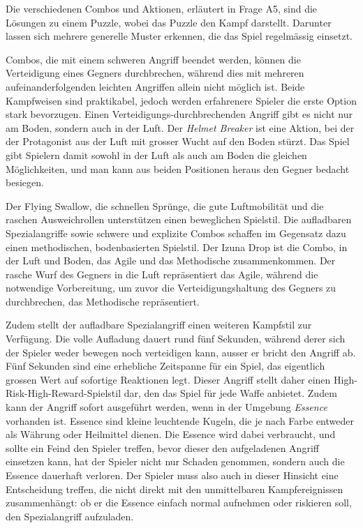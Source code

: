 \documentclass[../Main.tex]{subfiles}
\begin{document}
Die verschiedenen Combos und Aktionen, erläutert in Frage A5, sind die Lösungen zu einem Puzzle, wobei das Puzzle den Kampf darstellt. Darunter lassen sich mehrere generelle Muster erkennen, die das Spiel regelmässig einsetzt.

Combos, die mit einem schweren Angriff beendet werden, können die Verteidigung eines Gegners durchbrechen, während dies mit mehreren aufeinanderfolgenden leichten Angriffen allein nicht möglich ist. Beide Kampfweisen sind praktikabel, jedoch werden erfahrenere Spieler die erste Option stark bevorzugen. Einen Verteidigungs-durchbrechenden Angriff gibt es nicht nur am Boden, sondern auch in der Luft. Der \textit{Helmet Breaker} ist eine Aktion, bei der der Protagonist aus der Luft mit grosser Wucht auf den Boden stürzt. Das Spiel gibt Spielern damit sowohl in der Luft als auch am Boden die gleichen Möglichkeiten, und man kann aus beiden Positionen heraus den Gegner bedacht besiegen.

Der Flying Swallow, die schnellen Sprünge, die gute Luftmobilität und die raschen Ausweichrollen unterstützen einen beweglichen Spielstil. Die aufladbaren Spezialangriffe sowie schwere und explizite Combos schaffen im Gegensatz dazu einen methodischen, bodenbasierten Spielstil. Der Izuna Drop ist die Combo, in der Luft und Boden, das Agile und das Methodische zusammenkommen. Der rasche Wurf des Gegners in die Luft repräsentiert das Agile, während die notwendige Vorbereitung, um zuvor die Verteidigungshaltung des Gegners zu durchbrechen, das Methodische repräsentiert.

Zudem stellt der aufladbare Spezialangriff einen weiteren Kampfstil zur Verfügung. Die volle Aufladung dauert rund fünf Sekunden, während derer sich der Spieler weder bewegen noch verteidigen kann, ausser er bricht den Angriff ab. Fünf Sekunden sind eine erhebliche Zeitspanne für ein Spiel, das eigentlich grossen Wert auf sofortige Reaktionen legt. Dieser Angriff stellt daher einen High-Risk-High-Reward-Spielstil dar, den das Spiel für jede Waffe anbietet. Zudem kann der Angriff sofort ausgeführt werden, wenn in der Umgebung \textit{Essence} vorhanden ist. Essence sind kleine leuchtende Kugeln, die je nach Farbe entweder als Währung oder Heilmittel dienen. Die Essence wird dabei verbraucht, und sollte ein Feind den Spieler treffen, bevor dieser den aufgeladenen Angriff einsetzen kann, hat der Spieler nicht nur Schaden genommen, sondern auch die Essence dauerhaft verloren. Der Spieler muss also auch in dieser Hinsicht eine Entscheidung treffen, die nicht direkt mit den unmittelbaren Kampfereignissen zusammenhängt: ob er die Essence einfach normal aufnehmen oder riskieren soll, den Spezialangriff aufzuladen.
\end{document}
